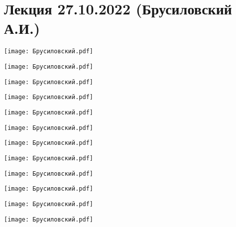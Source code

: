 \documentclass[main.tex]{subfiles}
\begin{document}
\section{Лекция 27.10.2022 (Брусиловский А.И.)}

\begin{center}
\texttt{[image: Брусиловский.pdf]}
\end{center}

\begin{center}
\texttt{[image: Брусиловский.pdf]}
\end{center}

\begin{center}
\texttt{[image: Брусиловский.pdf]}
\end{center}

\begin{center}
\texttt{[image: Брусиловский.pdf]}
\end{center}

\begin{center}
\texttt{[image: Брусиловский.pdf]}
\end{center}

\begin{center}
\texttt{[image: Брусиловский.pdf]}
\end{center}

\begin{center}
\texttt{[image: Брусиловский.pdf]}
\end{center}

\begin{center}
\texttt{[image: Брусиловский.pdf]}
\end{center}

\begin{center}
\texttt{[image: Брусиловский.pdf]}
\end{center}

\begin{center}
\texttt{[image: Брусиловский.pdf]}
\end{center}

\begin{center}
\texttt{[image: Брусиловский.pdf]}
\end{center}

\begin{center}
\texttt{[image: Брусиловский.pdf]}
\end{center}
\end{document}
